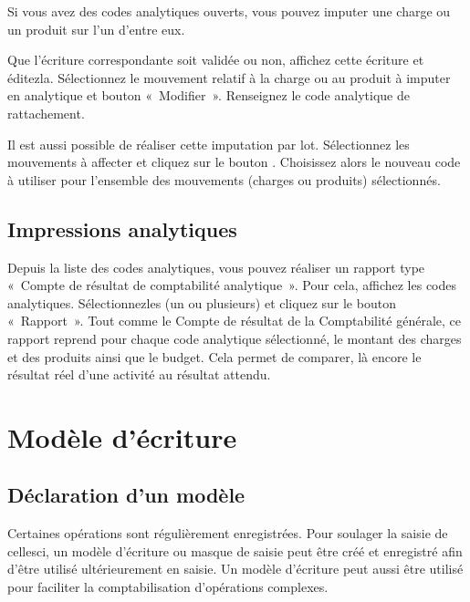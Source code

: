 \documentclass[a4paper,10pt,oneside,french]{sphinxmanual}
\begin{document}
\sphinxAtStartPar
Si vous avez des codes analytiques ouverts, vous pouvez imputer une charge ou un produit sur l’un d’entre eux.
\begin{quote}

\noindent{}
\end{quote}

\sphinxAtStartPar
Que l’écriture correspondante soit validée ou non, affichez cette écriture  et éditez\sphinxhyphen{}la.
Sélectionnez le  mouvement relatif à la charge ou au produit à imputer en analytique et bouton « Modifier ».
Renseignez le code analytique de rattachement.

\sphinxAtStartPar
Il est aussi possible de réaliser cette imputation par lot.
Sélectionnez les mouvements à affecter et cliquez sur le bouton . Choisissez alors le nouveau code à utiliser
pour l’ensemble des mouvements (charges ou  produits) sélectionnés.


\subsection{Impressions analytiques}
\label{\detokenize{accounting/costaccounting:impressions-analytiques}}
\sphinxAtStartPar
Depuis la liste des codes analytiques, vous pouvez réaliser un rapport type « Compte de résultat de comptabilité analytique ».
Pour cela, affichez les codes analytiques. Sélectionnez\sphinxhyphen{}les (un ou plusieurs) et cliquez sur le bouton « Rapport ».
Tout comme le Compte de résultat de la Comptabilité générale, ce rapport reprend pour chaque code analytique sélectionné, le montant des charges et des produits ainsi que le budget. Cela permet de comparer, là encore le résultat réel d’une activité au résultat attendu.

\sphinxstepscope


\section{Modèle d’écriture}
\label{\detokenize{accounting/model:modele-d-ecriture}}\label{\detokenize{accounting/model::doc}}

\subsection{Déclaration d’un modèle}
\label{\detokenize{accounting/model:declaration-d-un-modele}}
\sphinxAtStartPar
Certaines opérations sont régulièrement enregistrées. Pour soulager la saisie de celles\sphinxhyphen{}ci, un modèle d’écriture ou masque de saisie peut être créé et enregistré afin d’être utilisé ultérieurement en saisie.
Un modèle d’écriture peut aussi être utilisé pour faciliter la comptabilisation d’opérations complexes.
\end{document}
